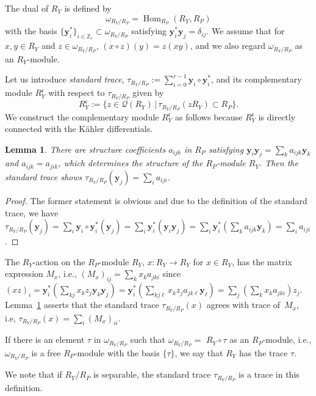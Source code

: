 \documentclass[pdftex]{sigma}
\def\ZZ{{\mathbb Z}}
\def\bby{{\mathbf y}}
\def\cQ{{\mathcal Q}}
\def\fc{{\mathfrak c}}
\numberwithin{equation}{section}
\newtheorem{Lemma}[Theorem]{Lemma}
\begin{document}
The dual of $R_Y$ is defined by
\[
\omega_{R_Y/R_P}=\operatorname{Hom}_{R_P}(R_Y, R_P)
\]
with the basis $\{\bby_i^*\}_{i\in \ZZ_r} \subset \omega_{R_Y/R_P}$ satisfying $\bby_i^*\bby_j=\delta_{i j}$.
We assume that for $x, y\in R_Y$ and $z\in \omega_{R_Y/R_P}$, $(x\circ z)(y)=z(xy)$, and we also regard $\omega_{R_Y/R_P}$ as an $R_Y$-module.


Let us introduce \emph{standard trace},
$\tau_{R_Y/R_P}:=\sum_{i=0}^{r-1}\bby_i\circ\bby_i^*$,
 and its complementary module $R_Y^\fc$ with respect to $\tau_{R_Y/R_P}$ given by
\[
R_Y^\fc:=\{z \in \cQ(R_Y) \, | \, \tau_{R_Y/R_P}(z R_Y) \subset R_P \}.
\]
We construct the complementary module $R_Y^\fc$ as follows because $R_Y^\fc$ is directly connected with the K\"ahler differentials.

\begin{Lemma}\label{2lm:trace_1.1}
There are structure coefficients $a_{i j k}$ in $R_P$ satisfying
$\bby_i \bby_j = \sum_{k} a_{i j k} \bby_k$ and ${a_{ijk}=a_{jik}}$, which determines the structure of the $R_P$-module $R_Y$.
Then the standard trace shows $\tau_{R_Y/R_P}(\bby_j)=\sum_i a_{i j i}$.
\end{Lemma}

\begin{proof}
The former statement is obvious and due to the definition of the standard trace, we have $\tau_{R_Y/R_P}(\bby_j)=\sum_{i}
\bby_i\circ \bby_i^*(\bby_j)=\sum_{i} \bby_i^*(\bby_i\bby_j) =\sum_{i} \bby_i^*(\sum_k a_{i j k} \bby_k)=\sum_i a_{i j i}$.
\end{proof}

The $R_Y$-action on the $R_P$-module $R_Y$, $x\colon R_Y \to R_Y$ for $x\in R_Y$, has the matrix expression $M_x$, i.e., $(M_x)_{ij}=\sum_k x_k a_{jki}$ since
$(xz)_i=\bby_i^*(\sum_{kj} x_k z_j\bby_k\bby_j)
=\bby_i^*(\sum_{kj\ell} x_k z_ja_{jk\ell}\bby_\ell)
=\sum_j(\sum_k x_k a_{jki}) z_j$.
Lemma~\ref{2lm:trace_1.1} asserts that the standard trace $\tau_{R_Y/R_P}(x)$ agrees with trace of~$M_x$, i.e, $\tau_{R_Y/R_P}(x)=\sum_{i} (M_x)_{ii}$.

\begin{Definition}\label{2df:trace_1.1}
If there is an element $\tau$ in $\omega_{R_Y/R_P}$ such that $\omega_{R_Y/R_P}=$ $R_Y\circ\tau$ as an $R_P$-module, i.e., $\omega_{R_Y/R_P}$ is a free $R_P$-module with the basis $\{\tau\}$, we say that $R_Y$ has the trace $\tau$.
\end{Definition}

We note that if $R_Y/R_P$ is separable, the standard trace $\tau_{R_Y/R_P}$ is a trace in this definition.
\end{document}
